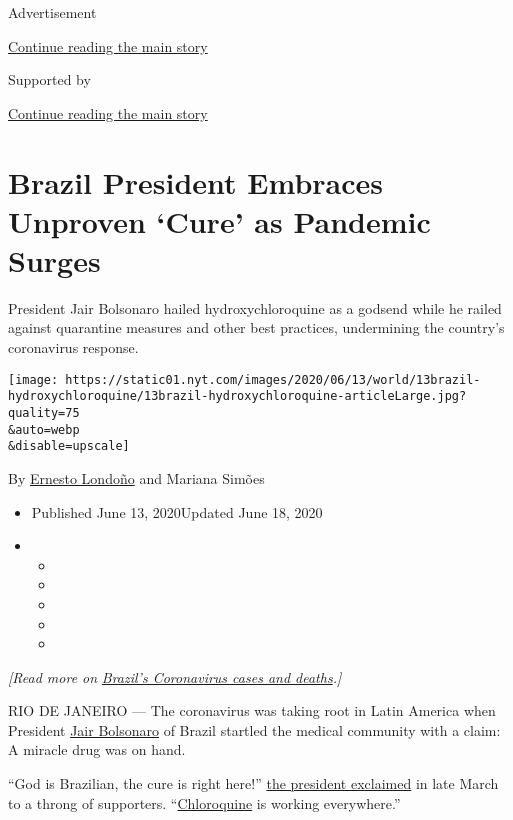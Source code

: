 Advertisement

\protect\hyperlink{after-top}{Continue reading the main story}

Supported by

\protect\hyperlink{after-sponsor}{Continue reading the main story}

\hypertarget{brazil-president-embraces-unproven-cure-as-pandemic-surges}{%
\section{Brazil President Embraces Unproven `Cure' as Pandemic
Surges}\label{brazil-president-embraces-unproven-cure-as-pandemic-surges}}

President Jair Bolsonaro hailed hydroxychloroquine as a godsend while he
railed against quarantine measures and other best practices, undermining
the country's coronavirus response.

\texttt{[image: https://static01.nyt.com/images/2020/06/13/world/13brazil-hydroxychloroquine/13brazil-hydroxychloroquine-articleLarge.jpg?quality=75\\\&auto=webp\\\&disable=upscale]}

By \href{https://www.nytimes.com/by/ernesto-londono}{Ernesto Londoño}
and Mariana Simões

\begin{itemize}
\item
  Published June 13, 2020Updated June 18, 2020
\item
  \begin{itemize}
  \item
  \item
  \item
  \item
  \item
  \end{itemize}
\end{itemize}

\emph{{[}Read more on}
\href{https://www.nytimes.com/article/brazil-coronavirus-cases.html}{\emph{Brazil's
Coronavirus cases and deaths}}\emph{.{]}}

RIO DE JANEIRO --- The coronavirus was taking root in Latin America when
President
\href{https://www.nytimes.com/2020/07/07/world/americas/brazil-bolsonaro-coronavirus.html}{Jair
Bolsonaro} of Brazil startled the medical community with a claim: A
miracle drug was on hand.

``God is Brazilian, the cure is right here!''
\href{https://oglobo.globo.com/sociedade/coronavirus/deus-brasileiro-a-cura-ta-ai-diz-bolsonaro-sobre-remedio-ainda-em-teste-contra-covid-19-1-24337060}{the
president exclaimed} in late March to a throng of supporters.
``\href{https://www.nytimes.com/2020/06/15/health/fda-hydroxychloroquine-malaria.html}{Chloroquine}
is working everywhere.''

